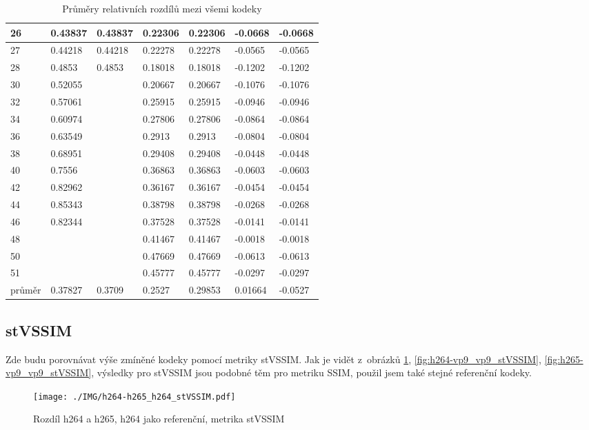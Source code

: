 \documentclass[thesis=M,czech]{FITthesis}[2016/06/26]
\begin{document}
\begin{table}[]
\begin{tabular}{|l|l|l|l|l|l|l|}
26     & 0.43837   & 0.43837 & 0.22306  & 0.22306 & -0.0668  & -0.0668 \\ \hline
27     & 0.44218   & 0.44218 & 0.22278  & 0.22278 & -0.0565  & -0.0565 \\ \hline
28     & 0.4853    & 0.4853  & 0.18018  & 0.18018 & -0.1202  & -0.1202 \\ \hline
30     & 0.52055   &         & 0.20667  & 0.20667 & -0.1076  & -0.1076 \\ \hline
32     & 0.57061   &         & 0.25915  & 0.25915 & -0.0946  & -0.0946 \\ \hline
34     & 0.60974   &         & 0.27806  & 0.27806 & -0.0864  & -0.0864 \\ \hline
36     & 0.63549   &         & 0.2913   & 0.2913  & -0.0804  & -0.0804 \\ \hline
38     & 0.68951   &         & 0.29408  & 0.29408 & -0.0448  & -0.0448 \\ \hline
40     & 0.7556    &         & 0.36863  & 0.36863 & -0.0603  & -0.0603 \\ \hline
42     & 0.82962   &         & 0.36167  & 0.36167 & -0.0454  & -0.0454 \\ \hline
44     & 0.85343   &         & 0.38798  & 0.38798 & -0.0268  & -0.0268 \\ \hline
46     & 0.82344   &         & 0.37528  & 0.37528 & -0.0141  & -0.0141 \\ \hline
48     &           &         & 0.41467  & 0.41467 & -0.0018  & -0.0018 \\ \hline
50     &           &         & 0.47669  & 0.47669 & -0.0613  & -0.0613 \\ \hline
51     &           &         & 0.45777  & 0.45777 & -0.0297  & -0.0297 \\ \hline
průměr & 0.37827   & 0.3709  & 0.2527   & 0.29853 & 0.01664  & -0.0527 \\ \hline
\end{tabular}
\caption{Průměry relativních rozdílů mezi všemi kodeky}
\label{tab:all_avgs_SSIM}
\end{table}


\subsection{stVSSIM}
Zde budu porovnávat výše zmíněné kodeky pomocí metriky stVSSIM. Jak je vidět z~obrázků \ref{fig:h264-h265_h264_stVSSIM}, \ref{fig:h264-vp9_vp9_stVSSIM}, \ref{fig:h265-vp9_vp9_stVSSIM}, výsledky pro stVSSIM jsou podobné těm pro metriku SSIM, použil jsem také stejné referenční kodeky. 
\begin{figure}[htb]\centering
\texttt{[image: ./IMG/h264-h265\_h264\_stVSSIM.pdf]}
\caption{Rozdíl h264 a h265, h264 jako referenční, metrika stVSSIM}
\label{fig:h264-h265_h264_stVSSIM}
\end{figure}
\end{document}

